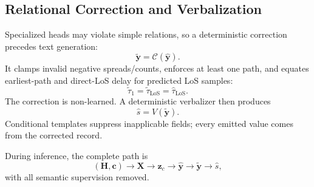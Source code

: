 \documentclass[conference]{IEEEtran}
\begin{document}
\subsection{Relational Correction and Verbalization}

Specialized heads may violate simple relations, so a deterministic correction precedes text generation:
\[
\widetilde{\mathbf y}=\mathcal C(\hat{\mathbf y}).
\]
It clamps invalid negative spreads/counts, enforces at least one path, and equates earliest-path and
direct-LoS delay for predicted LoS samples:
\[
\widetilde{\tau}_1=\widetilde{\tau}_{\mathrm{LoS}}=\hat{\tau}_{\mathrm{LoS}}.
\]
The correction is non-learned. A deterministic verbalizer then produces
\[
\hat{s}=V(\widetilde{\mathbf y}).
\]
Conditional templates suppress inapplicable fields; every emitted value comes from the corrected record.

During inference, the complete path is
\[
(\mathbf H,\mathbf c)\rightarrow\mathbf X\rightarrow\mathbf z_c\rightarrow
\hat{\mathbf y}\rightarrow\widetilde{\mathbf y}\rightarrow\hat{s},
\]
with all semantic supervision removed.




\end{document}
